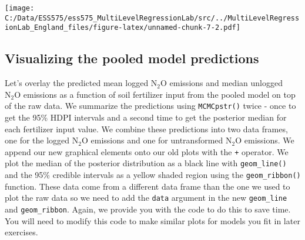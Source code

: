 \documentclass[
]{article}
\begin{document}
\texttt{[image: C:/Data/ESS575/ess575\_MultiLevelRegressionLab/src/../MultiLevelRegressionLab\_England\_files/figure-latex/unnamed-chunk-7-2.pdf]}

\hypertarget{visualizing-the-pooled-model-predictions}{%
\subsection{Visualizing the pooled model
predictions}\label{visualizing-the-pooled-model-predictions}}

Let's overlay the predicted mean logged \(\textrm{N} _2 \textrm{O}\)
emissions and median unlogged \(\textrm{N} _2 \textrm{O}\) emissions as
a function of soil fertilizer input from the pooled model on top of the
raw data. We summarize the predictions using \texttt{MCMCpstr()} twice -
once to get the 95\% HDPI intervals and a second time to get the
posterior median for each fertilizer input value. We combine these
predictions into two data frames, one for the logged
\(\textrm{N} _2 \textrm{O}\) emissions and one for untransformed
\(\textrm{N} _2 \textrm{O}\) emissions. We append our new graphical
elements onto our old plots with the \texttt{+} operator. We plot the
median of the posterior distribution as a black line with
\texttt{geom\_line()} and the 95\% credible intervals as a yellow shaded
region using the \texttt{geom\_ribbon()} function. These data come from
a different data frame than the one we used to plot the raw data so we
need to add the \texttt{data} argument in the new \texttt{geom\_line}
and \texttt{geom\_ribbon}. Again, we provide you with the code to do
this to save time. You will need to modify this code to make similar
plots for models you fit in later exercises.
\end{document}

